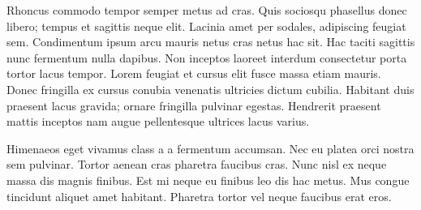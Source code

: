 Rhoncus commodo tempor semper metus ad cras. Quis sociosqu phasellus donec
libero; tempus et sagittis neque elit. Lacinia amet per sodales, adipiscing
feugiat sem. Condimentum ipsum arcu mauris netus cras netus hac sit. Hac taciti
sagittis nunc fermentum nulla dapibus. Non inceptos laoreet interdum
consectetur porta tortor lacus tempor. Lorem feugiat et cursus elit fusce massa
etiam mauris. Donec fringilla ex cursus conubia venenatis ultricies dictum
cubilia. Habitant duis praesent lacus gravida; ornare fringilla pulvinar
egestas. Hendrerit praesent mattis inceptos nam augue pellentesque ultrices
lacus varius.

Himenaeos eget vivamus class a a fermentum accumsan. Nec eu platea orci nostra
sem pulvinar. Tortor aenean cras pharetra faucibus cras. Nunc nisl ex neque
massa dis magnis finibus. Est mi neque eu finibus leo dis hac metus. Mus congue
tincidunt aliquet amet habitant. Pharetra tortor vel neque faucibus erat eros.


